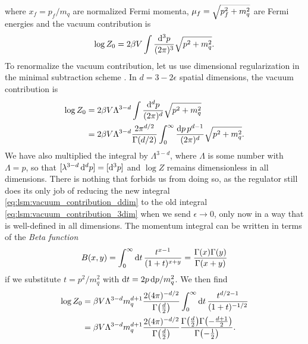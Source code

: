 where $x_f = p_f / m_q$ are normalized Fermi momenta, $\mu_f = \smash{\sqrt{p_f^2 + m_q^2}}$ are Fermi energies and the vacuum contribution is
\begin{equation}
	\log Z_0 = 2 \beta V \int \frac{\mathop{}\!\mathrm{d}^3 p}{(2 \pi)^3} \sqrt{p^2 + m_q^2 } .
\label{eq:lsm:vacuum_contribution_3dim}
\end{equation}
To renormalize the vacuum contribution, let us use dimensional regularization in the minimal subtraction scheme .
In $d = 3 - 2 \epsilon$ spatial dimensions, the vacuum contribution is
\begin{equation}
\begin{split}
	\log Z_0 &= 2 \beta V \Lambda^{3-d} \int \frac{\mathop{}\!\mathrm{d}^d p}{(2 \pi)^d} \sqrt{p^2 + m_q^2} \\
	         &= 2 \beta V \Lambda^{3-d} \frac{2 \pi^{d/2}}{\Gamma(d/2)} \int_0^\infty \frac{\mathop{}\!\mathrm{d} p \, p^{d-1}}{(2 \pi)^d} \sqrt{p^2 + m_q^2} .
\end{split}
\label{eq:lsm:vacuum_contribution_ddim}
\end{equation}
We have also multiplied the integral by $\Lambda^{3-d}$,
where $\Lambda$ is some number with $\unit{\Lambda} = \unit{p}$,
so that $[\lambda^{3-d} \mathop{}\!\mathrm{d}^d p] = [\mathop{}\!\mathrm{d}^3 p]$ and $\log Z$ remains dimensionless in all dimensions.
There is nothing that forbids us from doing so, 
as the regulator still does its only job of reducing the new integral \eqref{eq:lsm:vacuum_contribution_ddim} to the old integral \eqref{eq:lsm:vacuum_contribution_3dim} when we send $\epsilon \rightarrow 0$,
only now in a way that is well-defined in all dimensions.
The momentum integral can be written in terms of the \emph{Beta function} 
\begin{equation}
	B(x,y) = \int_0^\infty \mathop{}\!\mathrm{d} t \, \frac{t^{x-1}}{(1+t)^{x+y}} = \frac{\Gamma(x) \Gamma(y)}{\Gamma(x+y)}
\end{equation}
if we substitute $t = p^2/m_q^2$ with $\mathop{}\!\mathrm{d} t = 2 p \mathop{}\!\mathrm{d} p / m_q^2$.
We then find
\begin{equation}
\begin{split}
	\log Z_0 &= \beta V \Lambda^{3-d} m_q^{d+1} \frac{2 (4 \pi)^{-d/2}}{\Gamma\big(\frac{d}{2}\big)} \int_0^\infty \mathop{}\!\mathrm{d} t \, \frac{t^{d/2-1}}{(1+t)^{-1/2}} \\
	         &= \beta V \Lambda^{3-d} m_q^{d+1} \frac{2 (4 \pi)^{-d/2}}{\Gamma\big(\frac{d}{2}\big)} \frac{\Gamma\big(\frac{d}{2}\big) \Gamma\big( \textstyle{-\frac{d+1}{2}} \big)}{\Gamma\big( \textstyle{-\frac{1}{2}} \big)} .
\end{split}
\end{equation}
